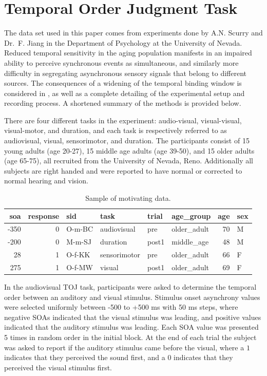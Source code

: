 \documentclass[11pt, oneside, openany]{scrbook}
\begin{document}
\hypertarget{toj-task}{%
\section{Temporal Order Judgment Task}\label{toj-task}}

The data set used in this paper comes from experiments done by A.N. Scurry and Dr.~F. Jiang in the Department of Psychology at the University of Nevada. Reduced temporal sensitivity in the aging population manifests in an impaired ability to perceive synchronous events as simultaneous, and similarly more difficulty in segregating asynchronous sensory signals that belong to different sources. The consequences of a widening of the temporal binding window is considered in \citet{scurry2019aging}, as well as a complete detailing of the experimental setup and recording process. A shortened summary of the methods is provided below.

There are four different tasks in the experiment: audio-visual, visual-visual, visual-motor, and duration, and each task is respectively referred to as audiovisual, visual, sensorimotor, and duration. The participants consist of 15 young adults (age 20-27), 15 middle age adults (age 39-50), and 15 older adults (age 65-75), all recruited from the University of Nevada, Reno. Additionally all subjects are right handed and were reported to have normal or corrected to normal hearing and vision.

\begin{table}[!h]

\caption{\label{tab:ch020-multitask-data}Sample of motivating data.}
\centering
\begin{tabular}[t]{rrllllrl}
\toprule
soa & response & sid & task & trial & age\_group & age & sex\\
\midrule
-350 & 0 & O-m-BC & audiovisual & pre & older\_adult & 70 & M\\
-200 & 0 & M-m-SJ & duration & post1 & middle\_age & 48 & M\\
28 & 1 & O-f-KK & sensorimotor & pre & older\_adult & 66 & F\\
275 & 1 & O-f-MW & visual & post1 & older\_adult & 69 & F\\
\bottomrule
\end{tabular}
\end{table}

In the audiovisual TOJ task, participants were asked to determine the temporal order between an auditory and visual stimulus. Stimulus onset asynchrony values were selected uniformly between -500 to +500 ms with 50 ms steps, where negative SOAs indicated that the visual stimulus was leading, and positive values indicated that the auditory stimulus was leading. Each SOA value was presented 5 times in random order in the initial block. At the end of each trial the subject was asked to report if the auditory stimulus came before the visual, where a \(1\) indicates that they perceived the sound first, and a \(0\) indicates that they perceived the visual stimulus first.
\end{document}
